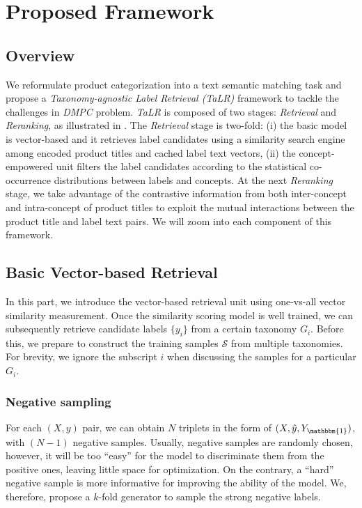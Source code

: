 \section{Proposed Framework}
\subsection{Overview}
We reformulate product categorization into a text semantic matching task and propose a \textit{Taxonomy-agnostic Label Retrieval (TaLR)} framework to tackle the challenges in \textit{DMPC} problem.
\textit{TaLR} is composed of two stages: \textit{Retrieval} and \textit{Reranking}, as illustrated in . The \textit{Retrieval} stage is two-fold: (i) the basic model is vector-based
and it retrieves label candidates using a similarity search engine among encoded product titles and cached label text vectors, 
(ii) the concept-empowered unit filters the label candidates according to the statistical co-occurrence distributions between labels and concepts.
At the next \textit{Reranking} stage, 
we take advantage of the contrastive information from both inter-concept and intra-concept of product titles to exploit the mutual interactions between the product title and label text pairs. We will zoom into each component of this framework.

\subsection{Basic Vector-based Retrieval}
In this part, we introduce the vector-based retrieval unit using one-vs-all vector similarity measurement. Once the similarity scoring model is well trained, we can subsequently retrieve candidate labels $\{y_i\}$ from a certain taxonomy $G_i$. Before this, we prepare to construct the training samples $\mathcal{S}$ from multiple taxonomies. For brevity, we ignore the subscript $i$ when discussing the samples for a particular $G_i$.
\subsubsection{Negative sampling}
\label{sec:prepare}
For each $(X, y)$ pair, we can obtain $N$ triplets in the form of $(X, \hat{y}, Y_{\mathbbm{1}})$, with $(N-1)$ negative samples. Usually, negative samples are randomly chosen, however, it will be too ``easy'' for the model to discriminate them from the positive ones, leaving little space for optimization. On the contrary, a ``hard'' negative sample is more informative for improving the ability of the model. We, therefore, propose a $k$-fold generator to sample the strong negative labels.

